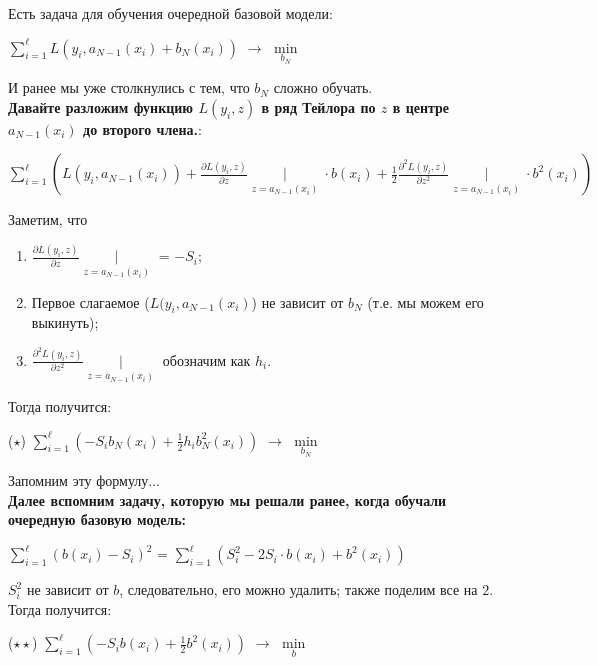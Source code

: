         Есть задача для обучения очередной базовой модели:
        \begin{center}
            $\sum\limits_{i = 1}^\ell L(y_i, a_{N - 1}(x_i) + b_N(x_i))$ $\longrightarrow$ $\min\limits_{b_N}$
        \end{center}
        И ранее мы уже столкнулись с тем, что $b_N$ сложно обучать.\\

        \textbf{Давайте разложим функцию $L(y_i, z)$ в ряд Тейлора по $z$ в центре $a_{N - 1}( x_i)$ до второго члена.}:
        \begin{center}
        \Large
            $\sum\limits_{i = 1}^\ell (L(y_i, a_{N - 1}(x_i)) + \frac{\partial L(y_i, z)}{\partial z} \mid\limits_{z = a_{N-1}(x_i)} \cdot b(x_i) + \frac{1}{2} \frac{\partial^2 L(y_i, z)}{\partial z^2} \mid\limits_{z = a_{N-1}(x_i)} \cdot b^2 (x_i))$
        \end{center}

        Заметим, что 
        \begin{enumerate}
            \item $\frac{\partial L(y_i, z)}{\partial z} \mid\limits_{z = a_{N-1}(x_i)}$ = $-S_i$; 

            \item Первое слагаемое ($L(y_i, a_{N - 1}(x_i)$) не зависит от $b_N$ (т.е. мы можем его выкинуть);

            \item $\frac{\partial^2 L(y_i, z)}{\partial z^2} \mid\limits_{z = a_{N-1}(x_i)}$ обозначим как $h_i$.
        \end{enumerate}
        Тогда получится:
        \begin{center}
        \Large
            ($\star$) \quad $\sum\limits_{i = 1}^\ell (-S_ib_N(x_i) + \frac{1}{2}h_ib_N^2(x_i))$ $\longrightarrow$ $\min\limits_{b_N}$
        \end{center}

        Запомним эту формулу...\\

        \textbf{Далее вспомним задачу, которую мы решали ранее, когда обучали очередную базовую модель:}
        \begin{center}
            \large
            $\sum\limits_{i = 1}^\ell(b(x_i) - S_i)^2$ = $\sum\limits_{i = 1}^\ell(S_i^2 - 2S_i\cdot b(x_i) + b^2(x_i))$
        \end{center}

        $S_i^2$  не зависит от $b$, следовательно, его можно удалить; \quad также поделим все на $2$. \\
        Тогда получится:
        \begin{center}
        \Large
           ($\star\star$) \quad $\sum\limits_{i = 1}^\ell(-S_ib(x_i) + \frac{1}{2}b^2(x_i))$ $\longrightarrow$ $\min\limits_{b}$
        \end{center}
        
